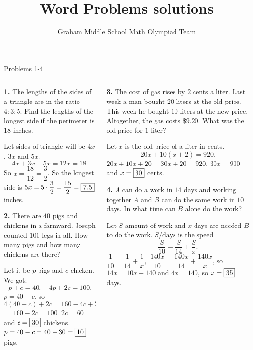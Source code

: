 \documentclass[9pt,aspectratio=169]{beamer}
\title{Word Problems solutions}
\subtitle[Graham Middle School]{Graham Middle School Math Olympiad Team}
\begin{document}
\maketitle

\begin{frame}{Problems 1-4}
  \begin{columns}[T]
    \begin{column}{0.5\textwidth}
      \begin{problem}
        \textbf{1.} The lengths of the sides of a triangle are in the ratio $4:3:5$. Find the lengths of the longest side if the perimeter is $18$ inches.
      \end{problem}\pause
      Let sides of triangle will be $4x$, $3x$ and $5x$.
      \[ 4x + 3x + 5x = 12x = 18. \]\pause
      So $x = \dfrac{18}{12} = \dfrac{3}{2}$. So the longest side is $5x = 5 \cdot \dfrac{3}{2} = \dfrac{15}{2} = \fbox{7{.}5}$ inches.\pause
      \begin{problem}
        \textbf{2.} There are $40$ pigs and chickens in a farmyard. Joseph counted $100$ legs in all. How many pigs and how many chickens are there?
      \end{problem}\pause
      Let it be $p$ pigs and $c$ chicken. We got:
      \[
        p + c = 40,\quad 4p + 2c = 100.
      \]\pause
      $p = 40 - c$, so $4(40-c) + 2c = 160 - 4c + 2c =$ $=160 - 2c = 100$. $2c = 60$ and $c = \fbox{30}$ chickens.
      $p = 40 - c = 40-30 = \fbox{10}$ pigs.\pause
    \end{column}
    \begin{column}{0.5\textwidth}
      \begin{problem}
        \textbf{3.} The cost of gas rises by $2$ cents a liter. Last week a man bought $20$ liters at the old price. This week he bought $10$ liters at the new price. Altogether, the gas costs \$$9{.}20$. What was the old price for $1$ liter?
      \end{problem}\pause
      Let $x$ is the old price of a liter in cents.
      \[ 20 x + 10 (x + 2) = 920. \]\pause
      $20x + 10x + 20 = 30x + 20 = 920$. $30x = 900$ and $x = \fbox{30}$ cents. \pause
      \begin{problem}
        \textbf{4.} $A$ can do a work in $14$ days and working together $A$ and $B$ can do the same work in $10$ days. In what time can $B$ alone do the work?
      \end{problem}\pause
      Let $S$ amount of work and $x$ days are needed $B$ to do the work. $S/\text{days}$ is the speed.
      \[ \frac{S}{10} = \frac{S}{14} + \frac{S}{x}. \] \pause
      $\dfrac{1}{10} = \dfrac{1}{14} + \dfrac{1}{x},$ $\dfrac{140x}{10} = \dfrac{140x}{14} + \dfrac{140x}{x}$, so $14x = 10x + 140$ and $4x = 140$, so $x = \fbox{35}$ days.
    \end{column}
  \end{columns}
\end{frame}
\end{document}
